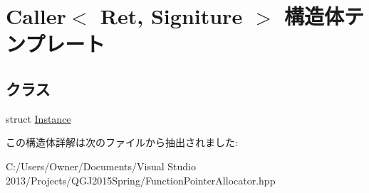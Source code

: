 \hypertarget{struct_caller}{}\section{Caller$<$ Ret, Signiture $>$ 構造体テンプレート}
\label{struct_caller}
\subsection*{クラス}
\begin{DoxyCompactItemize}
\item 
struct \hyperlink{struct_caller_1_1_instance}{Instance}
\end{DoxyCompactItemize}


この構造体詳解は次のファイルから抽出されました\+:\begin{DoxyCompactItemize}
\item 
C\+:/\+Users/\+Owner/\+Documents/\+Visual Studio 2013/\+Projects/\+Q\+G\+J2015\+Spring/Function\+Pointer\+Allocator.\+hpp\end{DoxyCompactItemize}
